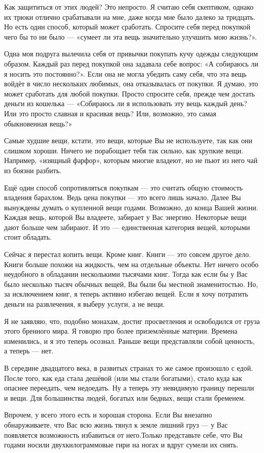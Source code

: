 \documentclass[ebook,12pt,oneside,openany]{memoir}
\begin{document}
Как защититься от этих людей? Это непросто. Я считаю себя скептиком,
однако их трюки отлично срабатывали на мне, даже когда мне было далеко
за тридцать. Но есть один способ, который может сработать. Спросите
себя перед покупкой чего бы то ни было — «сумеет ли эта вещь
значительно улучшить мою жизнь?».

Одна моя подруга вылечила себя от привычки покупать кучу одежды
следующим образом. Каждый раз перед покупкой она задавала себе вопрос:
«А собираюсь ли я носить это постоянно?». Если она не могла убедить
саму себя, что эта вещь войдёт в число нескольких любимых, она
отказывалась от покупки. Я думаю, это может сработать для любой
покупки. Просто спросите себя, прежде чем достать деньги из кошелька —
«Собираюсь ли я использовать эту вещь каждый день? Или это просто
славная и красивая вещь? Или, возможно, это самая обыкновенная вещь?»

Самые худшие вещи, кстати, это вещи, которые Вы не используете, так
как они слишком хороши. Ничего не порабощает тебя так сильно, как
хрупкие вещи. Например, «изящный фарфор», которым многие владеют, но
не пьют из него чай из боязни разбить.

Ещё один способ сопротивляться покупкам — это считать общую стоимость
владения барахлом. Ведь цена покупки — это всего лишь начало. Далее Вы
вынуждены думать о купленной вещи годами. Возможно, до конца Вашей
жизни. Каждая вещь, которой Вы владеете, забирает у Вас энергию.
Некоторые вещи дают больше чем забирают. И это — единственная
категория вещей, которыми стоит обладать.

Сейчас я перестал копить вещи. Кроме книг. Книги — это совсем другое
дело. Книги больше похожи на жидкость, чем на отдельные объекты. Нет
ничего особо неудобного в обладании несколькими тысячами книг. Тогда
как если бы у Вас было несколько тысяч обычных вещей, Вы были бы
местной знаменитостью. Но, за исключением книг, я теперь активно
избегаю вещей. Если я хочу потратить деньги на развлечения, я выберу
услуги, а не вещи.

Я не заявляю, что, подобно монахам, достиг просветления и освободился
от груза этого бренного мира. Я говорю про более приземлённые материи.
Времена изменились, и я это теперь осознал. Раньше вещи представляли
собой ценность, а теперь — нет.

В середине двадцатого века, в развитых странах то же самое произошло с
едой. После того, как еда стала дешёвой (или мы стали богатыми), стало
куда как опаснее переедать, чем недоедать. Ну а теперь эту невидимую
границу перешли и вещи. Для большинства людей, богатых или бедных,
вещи стали бременем.

Впрочем, у всего этого есть и хорошая сторона. Если Вы внезапно
обнаруживаете, что Вас всю жизнь тянул к земле лишний груз — у Вас
появляется возможность избавиться от него.Только представьте себе, что
Вы годами носили двухкилограммовые гири на ногах и вдруг сумели их
снять.
\end{document}
